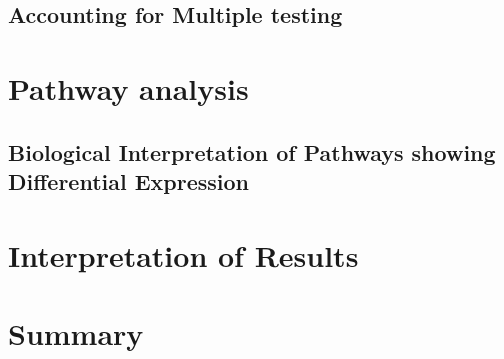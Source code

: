 \subsection{Accounting for Multiple testing}

\section{Pathway analysis}

\subsection{Biological Interpretation of Pathways showing Differential Expression}



\section{Interpretation of Results}




\section{Summary}
\enlargethispage{\baselineskip} %